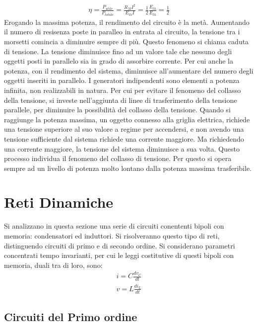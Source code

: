 \documentclass{article}
\numberwithin{equation}{subsection}
\begin{document}
\begin{gather*}
    \eta=\displaystyle\frac{P_{utile}}{P_{totale}}=\frac{R_{M}I^2}{E_{th}I}=\frac{1}{2}\frac{E_{th}}{E_{th}}=\frac{1}{2}
\end{gather*}
Erogando la massima potenza, il rendimento del circuito è la metà. Aumentando il numero di resisenza poste in paralleo in entrata al circuito, la tensione tra i morsetti 
comincia a diminuire sempre di più. Questo fenomeno si chiama caduta di tensione. La tensione diminuisce fino ad un valore tale che nessuno degli oggetti posti in parallelo 
sia in grado di assorbire corrente. Per cui anche la potenza, con il rendimento del sistema, diminuisce all'aumentare del numero degli oggetti inseriti in parallelo. I 
generatori indipendenti sono elementi a potenza infinita, non realizzabili in natura. Per cui per evitare il fenomeno del collasso della tensione, si investe nell'aggiunta di 
linee di trasferimento della tensione parallele, per diminuire la possibilità del collasso della tensione. Quando si raggiunge la potenza massima, un oggetto connesso alla 
griglia elettrica, richiede una tensione superiore al suo valore a regime per accendersi, e non avendo una tensione sufficiente dal sistema richiede una corrente maggiore. 
Ma richiedendo una corrente maggiore, la tensione del sistema diminuisce a sua volta. Questo processo individua il fenomeno del collasso di tensione. Per questo si opera 
sempre ad un livello di potenza molto lontano dalla potenza massima trasferibile. 

\clearpage 

\section{Reti Dinamiche}

Si analizzano in questa sezione una serie di circuiti conententi bipoli con memoria: condensatori ed induttori. Si risolveranno questo tipo di reti, distinguendo 
circuiti di primo e di secondo ordine. Si considerano parametri concentrati tempo invarianti, per cui le leggi costitutive di questi bipoli con memoria, duali tra di loro, sono:
\begin{gather*}
    i=\displaystyle C\frac{dv_C}{dt}\\
    v=\displaystyle L\frac{di_L}{dt}
\end{gather*}

\subsection{Circuiti del Primo ordine}
\end{document}
